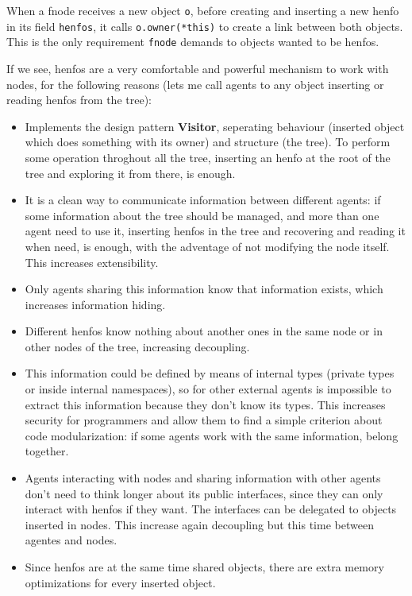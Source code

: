 \documentclass{article}
\begin{document}
When a fnode receives a new object \texttt{o}, before creating and inserting a
new henfo in its field \texttt{henfos}, it calls \texttt{o.owner(*this)} to
create a link between both objects. This is the only requirement \texttt{fnode}
demands to objects wanted to be henfos.

If we see, henfos are a very comfortable and powerful mechanism to work with
nodes, for the following reasons (lets me call agents to any object inserting or
reading henfos from the tree):

\begin{itemize}
\item Implements the design pattern \textbf{Visitor}, seperating behaviour
  (inserted object which does something with its owner) and structure (the
  tree). To perform some operation throghout all the tree, inserting an henfo at
  the root of the tree and exploring it from there, is enough.
\item It is a clean way to communicate information between different agents: if
  some information about the tree should be managed, and more than one agent
  need to use it, inserting henfos in the tree and recovering and reading it
  when need, is enough, with the adventage of not modifying the node itself. This
  increases extensibility.
\item Only agents sharing this information know that information exists, which
  increases information hiding.
\item Different henfos know nothing about another ones in the same node or
  in other nodes of the tree, increasing decoupling.
\item This information could be defined by means of internal types (private
  types or inside internal namespaces), so for other external agents is
  impossible to extract this information because they don't know its types. This
  increases security for programmers and allow them to find a simple criterion
  about code modularization: if some agents work with the same information,
  belong together.
\item Agents interacting with nodes and sharing information with other agents
  don't need to think longer about its public interfaces, since they can only
  interact with henfos if they want. The interfaces can be delegated to objects
  inserted in nodes. This increase again decoupling but this time between
  agentes and nodes.
\item Since henfos are at the same time shared objects, there are extra memory
  optimizations for every inserted object.
\end{itemize}
\end{document}

